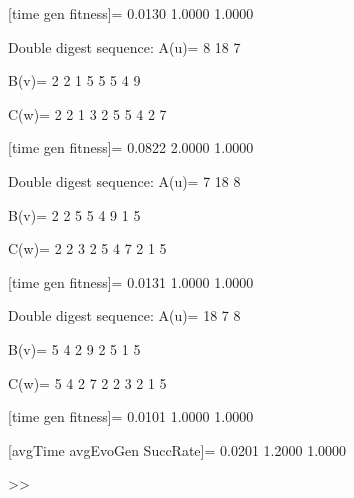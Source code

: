 [time gen fitness]=
    0.0130    1.0000    1.0000

Double digest sequence:
A(u)=
     8    18     7

B(v)=
     2     2     1     5     5     5     4     9

C(w)=
     2     2     1     3     2     5     5     4     2     7

[time gen fitness]=
    0.0822    2.0000    1.0000

Double digest sequence:
A(u)=
     7    18     8

B(v)=
     2     2     5     5     4     9     1     5

C(w)=
     2     2     3     2     5     4     7     2     1     5

[time gen fitness]=
    0.0131    1.0000    1.0000

Double digest sequence:
A(u)=
    18     7     8

B(v)=
     5     4     2     9     2     5     1     5

C(w)=
     5     4     2     7     2     2     3     2     1     5

[time gen fitness]=
    0.0101    1.0000    1.0000

[avgTime  avgEvoGen  SuccRate]=
    0.0201    1.2000    1.0000

>> 